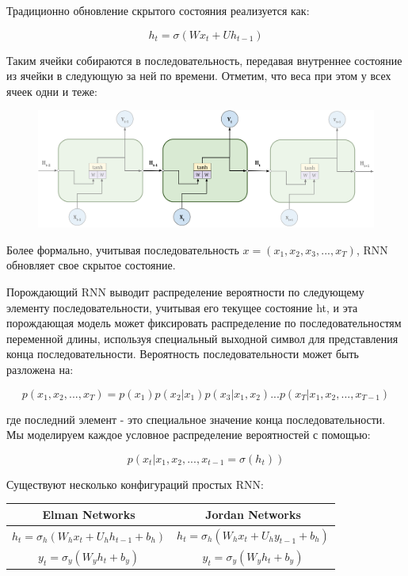 \documentclass[a4paper,12pt]{article}
\begin{document}
	Традиционно обновление скрытого состояния реализуется как:
	
	$$ h_t = \sigma(W x_t + U h_{t-1}) $$
	
	Таким ячейки собираются в последовательность, передавая внутреннее состояние из ячейки в следующую за ней по времени. Отметим, что веса при этом у всех ячеек одни и теже:
	
	\begin{figure}[ht!]
		\centering
		\captionsetup{justification=centering}
		\includegraphics[width=165mm]{img/rnn_unfolded.png}
	\end{figure}
	
	Более формально, учитывая последовательность $x = (x_1, x_2, x_3, ... , x_T)$, RNN обновляет свое скрытое состояние. 
	
	Порождающий RNN выводит распределение вероятности по следующему элементу последовательности, учитывая его текущее состояние ht, и эта порождающая модель может фиксировать распределение по последовательностям переменной длины, используя специальный выходной символ для представления конца последовательности. Вероятность последовательности может быть разложена на:
	
	$$ p(x_1, x_2, ..., x_T) = p(x_1) p(x_2 | x_1) p(x_3 | x_1, x_2) ... p(x_T | x_1, x_2, ... , x_{T - 1}) $$
	
	где последний элемент - это специальное значение конца последовательности. Мы моделируем каждое условное
	распределение вероятностей с помощью:
	
	$$ p(x_t | x_1, x_2, ... , x_{t - 1} = \sigma(h_t)) $$
	
	Существуют несколько конфигураций простых RNN:
	
	\begin{table}[h]
			\centering
			\begin{tabular}{|c|c|} 
				\hline
				\textbf{Elman Networks} & \textbf{Jordan Networks}  \\ 
				\hline
				$	h_{t} = \sigma_{h}(W_h x_t + U_h h_{t - 1} + b_h) $ & 
				$	h_{t} = \sigma_{h}(W_h x_t + U_h y_{t - 1} + b_h) $  \\
				$	y_{t} = \sigma_{y}(W_y h_t + b_y) $ & 
				$	y_{t} = \sigma_{y}(W_y h_t + b_y) $ \\
				\hline
			\end{tabular}
	\end{table}
	
\end{document}
